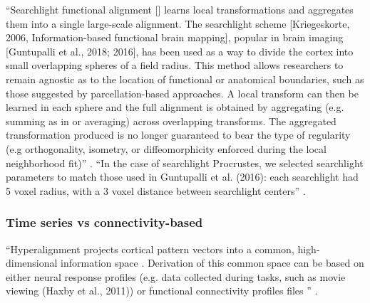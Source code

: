 ``Searchlight functional alignment [\citep{zhang2016searchlight,
guntupalli2016model}] learns local transformations and aggregates them into a
single large-scale alignment.
%
The searchlight scheme [Kriegeskorte, 2006, Information-based functional brain
mapping], popular in brain imaging [Guntupalli et al., 2018; 2016], has been
used as a way to divide the cortex into small overlapping spheres of a field
radius.
%
This method allows researchers to remain agnostic as to the location of
functional or anatomical boundaries, such as those suggested by
parcellation-based approaches.
%
A local transform can then be learned in each sphere and the full alignment is
obtained by aggregating (e.g. summing as in \citep{guntupalli2016model} or
averaging) across overlapping transforms.
%
The aggregated transformation produced is no longer guaranteed to bear the type
of regularity (e.g orthogonality, isometry, or diffeomorphicity enforced during
the local neighborhood fit)'' \citep{bazeille2021empirical}.
%
``In the case of searchlight Procrustes, we selected searchlight parameters to
match those used in Guntupalli et al. (2016):
%
each searchlight had 5 voxel radius, with a 3 voxel distance between searchlight
centers'' \citep{bazeille2021empirical}.


\subsubsection{Time series vs connectivity-based}






``Hyperalignment projects cortical pattern vectors into a common,
high-dimensional information space \citep{haxby2020hyperalignment}.
%
Derivation of this common space can be based on either neural response profiles
(e.g. data collected during tasks, such as movie viewing (Haxby et al., 2011))
or functional connectivity profiles files \citep{guntupalli2018computational}''
\citep{busch2021hybrid}.

